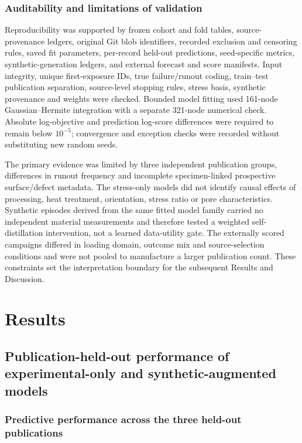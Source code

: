 \documentclass[12pt,a4paper]{article}
\begin{document}
\subsubsection{Auditability and limitations of validation}

Reproducibility was supported by frozen cohort and fold tables, source-provenance ledgers, original Git blob identifiers, recorded exclusion and censoring rules, saved fit parameters, per-record held-out predictions, seed-specific metrics, synthetic-generation ledgers, and external forecast and score manifests. Input integrity, unique first-exposure IDs, true failure/runout coding, train–test publication separation, source-level stopping rules, stress basis, synthetic provenance and weights were checked. Bounded model fitting used 161-node Gaussian–Hermite integration with a separate 321-node numerical check. Absolute log-objective and prediction log-score differences were required to remain below \(10^{-5}\); convergence and exception checks were recorded without substituting new random seeds.

The primary evidence was limited by three independent publication groups, differences in runout frequency and incomplete specimen-linked prospective surface/defect metadata. The stress-only models did not identify causal effects of processing, heat treatment, orientation, stress ratio or pore characteristics. Synthetic episodes derived from the same fitted model family carried no independent material measurements and therefore tested a weighted self-distillation intervention, not a learned data-utility gate. The externally scored campaigns differed in loading domain, outcome mix and source-selection conditions and were not pooled to manufacture a larger publication count. These constraints set the interpretation boundary for the subsequent Results and Discussion.

\section{Results}

\subsection{Publication-held-out performance of experimental-only and synthetic-augmented models}

\subsubsection{Predictive performance across the three held-out publications}
\end{document}
